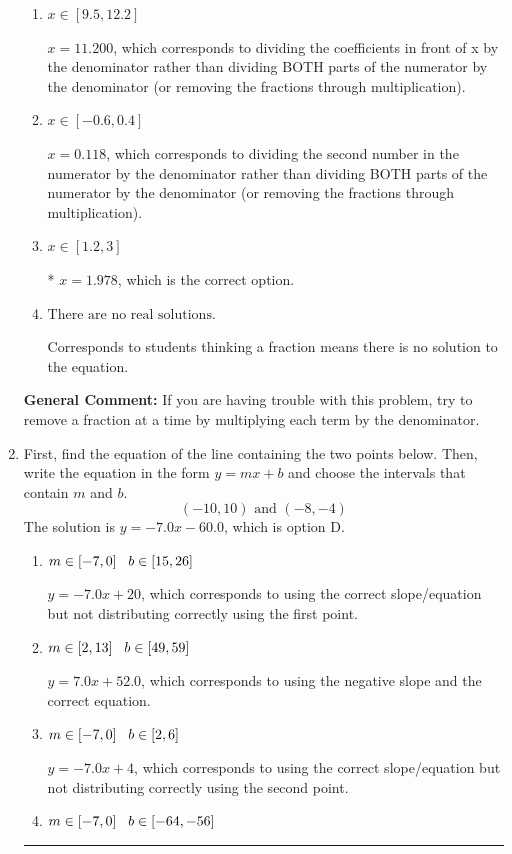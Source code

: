 \documentclass{extbook}[14pt]
\newcommand{\litem}[1]{\item #1

\rule{\textwidth}{0.4pt}}
\begin{document}
\begin{enumerate}
{\begin{enumerate}[label=\Alph*.]
 $x = -4.244$, which corresponds to not distributing the negative in front of the second fraction.
\item \( x \in [9.5, 12.2] \)

 $x = 11.200$, which corresponds to dividing the coefficients in front of x by the denominator rather than dividing BOTH parts of the numerator by the denominator (or removing the fractions through multiplication).
\item \( x \in [-0.6, 0.4] \)

 $x = 0.118$, which corresponds to dividing the second number in the numerator by the denominator rather than dividing BOTH parts of the numerator by the denominator (or removing the fractions through multiplication).
\item \( x \in [1.2, 3] \)

* $x = 1.978$, which is the correct option.
\item \( \text{There are no real solutions.} \)

Corresponds to students thinking a fraction means there is no solution to the equation.
\end{enumerate}

\textbf{General Comment:} If you are having trouble with this problem, try to remove a fraction at a time by multiplying each term by the denominator.
}
\litem{
First, find the equation of the line containing the two points below. Then, write the equation in the form $ y=mx+b $ and choose the intervals that contain $m$ and $b$.
\[ (-10, 10) \text{ and } (-8, -4) \]The solution is \( y = -7.0x -60.0 \), which is option D.\begin{enumerate}[label=\Alph*.]
\item \( m \in [-7, 0] \hspace*{3mm} b \in [15, 26] \)

 $y = -7.0x + 20$, which corresponds to using the correct slope/equation but not distributing correctly using the first point.
\item \( m \in [2, 13] \hspace*{3mm} b \in [49, 59] \)

 $y = 7.0x + 52.0$, which corresponds to using the negative slope and the correct equation.
\item \( m \in [-7, 0] \hspace*{3mm} b \in [2, 6] \)

 $y = -7.0x + 4$, which corresponds to using the correct slope/equation but not distributing correctly using the second point.
\item \( m \in [-7, 0] \hspace*{3mm} b \in [-64, -56] \)


\end{enumerate}}
\end{enumerate}
\end{document}
